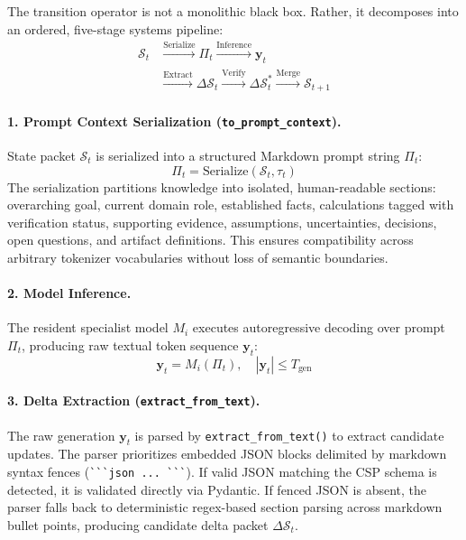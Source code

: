 The transition operator is not a monolithic black box. Rather, it decomposes into an ordered, five-stage systems pipeline:
\begin{equation}
\begin{aligned}
\mathcal{S}_t &\xrightarrow{\text{Serialize}} \Pi_t \xrightarrow{\text{Inference}} \mathbf{y}_t \\
&\xrightarrow{\text{Extract}} \Delta \mathcal{S}_t \xrightarrow{\text{Verify}} \Delta \mathcal{S}_t^* \xrightarrow{\text{Merge}} \mathcal{S}_{t+1}
\end{aligned}
\label{eq:transition_pipeline}
\end{equation}

\paragraph{1. Prompt Context Serialization (\texttt{to\_prompt\_context}).}
State packet $\mathcal{S}_t$ is serialized into a structured Markdown prompt string $\Pi_t$:
\begin{equation}
\Pi_t = \text{Serialize}(\mathcal{S}_t, \tau_t)
\end{equation}
The serialization partitions knowledge into isolated, human-readable sections: overarching goal, current domain role, established facts, calculations tagged with verification status, supporting evidence, assumptions, uncertainties, decisions, open questions, and artifact definitions. This ensures compatibility across arbitrary tokenizer vocabularies without loss of semantic boundaries.

\paragraph{2. Model Inference.}
The resident specialist model $M_i$ executes autoregressive decoding over prompt $\Pi_t$, producing raw textual token sequence $\mathbf{y}_t$:
\begin{equation}
\mathbf{y}_t = M_i(\Pi_t), \quad |\mathbf{y}_t| \le T_{\text{gen}}
\end{equation}

\paragraph{3. Delta Extraction (\texttt{extract\_from\_text}).}
The raw generation $\mathbf{y}_t$ is parsed by \texttt{extract\_from\_text()} to extract candidate updates. The parser prioritizes embedded JSON blocks delimited by markdown syntax fences (\verb|```json ... ```|). If valid JSON matching the CSP schema is detected, it is validated directly via Pydantic. If fenced JSON is absent, the parser falls back to deterministic regex-based section parsing across markdown bullet points, producing candidate delta packet $\Delta \mathcal{S}_t$.

